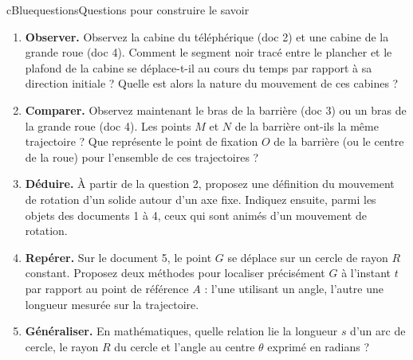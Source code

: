 \documentclass[11pt,a4paper]{article}
\newcommand{\kw}[1]{{\sffamily\bfseries\color{cBlue}#1}}   %
\begin{document}
\begin{rub}{cBlue}{questions}{Questions pour construire le savoir}
\begin{enumerate}
  \item \kw{Observer.} Observez la cabine du téléphérique (doc 2) et une cabine de la grande roue (doc 4). Comment le segment noir tracé entre le plancher et le plafond de la cabine se déplace-t-il au cours du temps par rapport à sa direction initiale ? Quelle est alors la nature du mouvement de ces cabines ?
  \item \kw{Comparer.} Observez maintenant le bras de la barrière (doc 3) ou un bras de la grande roue (doc 4). Les points $M$ et $N$ de la barrière ont-ils la même trajectoire ? Que représente le point de fixation $O$ de la barrière (ou le centre de la roue) pour l’ensemble de ces trajectoires ?
  \item \kw{Déduire.} À partir de la question 2, proposez une définition du mouvement de rotation d’un solide autour d’un axe fixe. Indiquez ensuite, parmi les objets des documents 1 à 4, ceux qui sont animés d’un mouvement de rotation.
  \item \kw{Repérer.} Sur le document 5, le point $G$ se déplace sur un cercle de rayon $R$ constant. Proposez deux méthodes pour localiser précisément $G$ à l’instant $t$ par rapport au point de référence $A$ : l’une utilisant un angle, l’autre une longueur mesurée sur la trajectoire.
  \item \kw{Généraliser.} En mathématiques, quelle relation lie la longueur $s$ d’un arc de cercle, le rayon $R$ du cercle et l’angle au centre $\theta$ exprimé en radians ?
\end{enumerate}
\end{rub}
\end{document}
